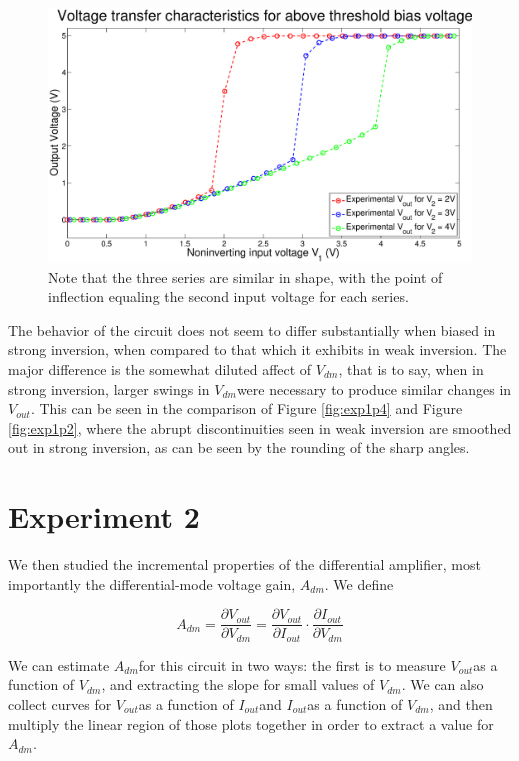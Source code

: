 \documentclass{article}
\newcommand{\Vout}{{$V_{out}$}}
\newcommand{\Vdm}{{$V_{dm}$}}
\newcommand{\Iout}{{$I_{out}$}}
\newcommand{\Adm}{{$A_{dm}$}}
\begin{document}
\begin{figure}[H]
\centering
\includegraphics[width=\linewidth]{../Figures/Exp1P3.eps}
\caption{Note that the three series are similar in shape, with the point of inflection equaling the second input voltage for each series.}
\label{fig:exp1p3}
\end{figure}


The behavior of the circuit does not seem to differ substantially when biased in strong inversion, when compared to that which it exhibits in weak inversion. The major difference is the somewhat diluted affect of $V_{dm}$, that is to say, when in strong inversion, larger swings in \Vdm were necessary to produce similar changes in \Vout. This can be seen in the comparison of Figure \ref{fig:exp1p4} and Figure \ref{fig:exp1p2}, where the abrupt discontinuities seen in weak inversion are smoothed out in strong inversion, as can be seen by the rounding of the sharp angles.


\section*{Experiment 2}

We then studied the incremental properties of the differential amplifier, most importantly the differential-mode voltage gain, \Adm. We define

\begin{equation}
A_{dm} = \frac{\partial V_{out}}{\partial V_{dm}} = \frac{\partial V_{out} }{\partial I_{out} } \cdot \frac{\partial I_{out}}{\partial V_{dm}}
\label{eq:adm}
\end{equation}

We can estimate \Adm for this circuit in two ways: the first is to measure \Vout as a function of \Vdm, and extracting the slope for small values of \Vdm. We can also collect curves for \Vout as a function of \Iout and \Iout as a function of \Vdm, and then multiply the linear region of those plots together in order to extract a value for \Adm.
\end{document}
